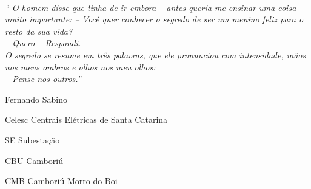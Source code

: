 \documentclass[a5paper,english,spanish,brazil]{ufsc-thesis}
\begin{document}
\begin{agradecimentos}
\lipsum[1]
\end{agradecimentos}

\begin{epigrafe}
    \vspace*{\fill}
		\noindent
		\hangindent=5cm \\
  \textit{`` O homem disse que tinha de ir embora -- antes queria me ensinar uma coisa muito importante: -- Você quer conhecer o segredo de ser um menino feliz para o resto da sua vida? \\ -- Quero -- Respondi. \\ O segredo se resume em três palavras, que ele pronunciou com intensidade, mãos nos meus ombros e olhos nos meu olhos: \\ -- Pense nos outros.''}
    \begin{flushright}
		Fernando Sabino	
		\end{flushright}		
\end{epigrafe}





 


\listoffigures
\cleardoublepage

\listoftables*
\cleardoublepage

\begin{siglas}
  \item[Celesc] Centrais Elétricas de Santa Catarina
  \item[SE] Subestação
  \item[CBU] Camboriú
  \item[CMB] Camboriú Morro do Boi
\end{siglas}
\end{document}
